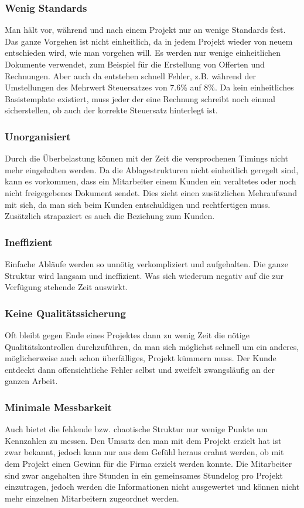 \subsubsection{Wenig Standards}
Man hält vor, während und nach einem Projekt nur an wenige Standards fest. 
Das ganze Vorgehen ist nicht einheitlich, da in jedem Projekt wieder von
neuem entschieden wird, wie man vorgehen will. Es werden nur wenige einheitlichen
Dokumente verwendet, zum Beispiel für die Erstellung von Offerten und Rechnungen.
Aber auch da entstehen schnell Fehler, z.B. während der Umstellungen des 
Mehrwert Steuersatzes von 7.6\% auf 8\%. Da kein einheitliches Basistemplate
existiert, muss jeder der eine Rechnung schreibt noch einmal sicherstellen, ob
auch der korrekte Steuersatz hinterlegt ist. 

\subsubsection{Unorganisiert}
Durch die Überbelastung können mit der Zeit die versprochenen Timings
nicht mehr eingehalten werden. Da die Ablagestrukturen nicht einheitlich geregelt
sind, kann es vorkommen, dass ein Mitarbeiter einem Kunden ein veraltetes oder
noch nicht freigegebenes Dokument sendet. Dies zieht einen zusätzlichen 
Mehraufwand mit sich, da man sich beim Kunden entschuldigen und rechtfertigen
muss. Zusätzlich strapaziert es auch die Beziehung zum Kunden.

\subsubsection{Ineffizient}
Einfache Abläufe werden so unnötig verkompliziert und aufgehalten. Die ganze
Struktur wird langsam und ineffizient. Was sich wiederum negativ auf die zur
Verfügung stehende Zeit auswirkt.

\subsubsection{Keine Qualitätssicherung}
Oft bleibt gegen Ende eines Projektes dann zu wenig Zeit die nötige 
Qualitätskontrollen durchzuführen, da man sich möglichst schnell um ein anderes,
möglicherweise auch schon überfälliges, Projekt kümmern muss. Der Kunde entdeckt
dann offensichtliche Fehler selbst und zweifelt zwangsläufig an der ganzen Arbeit.

\subsubsection{Minimale Messbarkeit}
Auch bietet die fehlende bzw. chaotische Struktur nur wenige Punkte um Kennzahlen
zu messen. Den Umsatz den man mit dem Projekt erzielt hat ist zwar bekannt,
jedoch kann nur aus dem Gefühl heraus erahnt werden, ob mit dem Projekt einen
Gewinn für die Firma erzielt werden konnte. Die Mitarbeiter sind zwar angehalten
ihre Stunden in ein gemeinsames Stundelog pro Projekt einzutragen, jedoch werden
die Informationen nicht ausgewertet und können nicht mehr einzelnen Mitarbeitern
zugeordnet werden.

